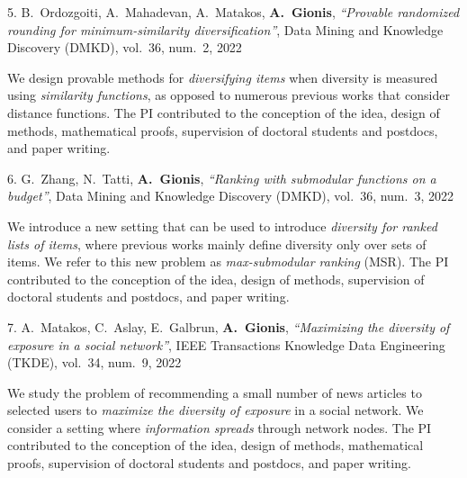 \documentclass[a4paper,11pt]{article}
\begin{document}
\textbibspace

\item[{5.}]
{B.\ Ordozgoiti, A.\ Mahadevan, A.\ Matakos, \textbf{A.\ Gionis}},
{\em ``Provable randomized rounding for minimum-similarity diversification''},
Data Mining and Knowledge Discovery (DMKD),
vol.\ 36, num.\ 2, 2022
%
\item[]
We design provable methods for \emph{diversifying items} when 
diversity is measured using \emph{similarity functions}, 
as opposed to numerous previous works that consider distance functions.
The PI contributed to the conception of the idea, 
design of methods, mathematical proofs, supervision of doctoral students and postdocs, and paper writing.

\textbibspace

\item[{6.}]
{G.\ Zhang, N.\ Tatti, \textbf{A.\ Gionis}},
{\em ``Ranking with submodular functions on a budget''},
Data Mining and Knowledge Discovery (DMKD),
vol.\ 36, num.\ 3, 2022
%
\item[]
We introduce a new setting that can be used to introduce 
\emph{diversity for ranked lists of items}, 
where previous works mainly define diversity only over sets of items.
We refer to this new problem as \emph{max-submodular ranking} (MSR).
The PI contributed to the conception of the idea, 
design of methods, supervision of doctoral students and postdocs, and paper writing.

\textbibspace

\item[{7.}]
{A.\ Matakos, C.\ Aslay, E.\ Galbrun, \textbf{A.\ Gionis}},
{\em ``Maximizing the diversity of exposure in a social network''},
IEEE Transactions Knowledge Data Engineering (TKDE),
vol.\ 34, num.\ 9, 2022
%
\item[]
We study the problem of recommending a small number of news articles to selected users
to \emph{maximize the diversity of exposure }in a social network. 
We consider a setting where \emph{information spreads} through network nodes.
The PI contributed to the conception of the idea, 
design of methods, mathematical proofs, supervision of doctoral students and postdocs, and paper writing.

\textbibspace
\end{document}
